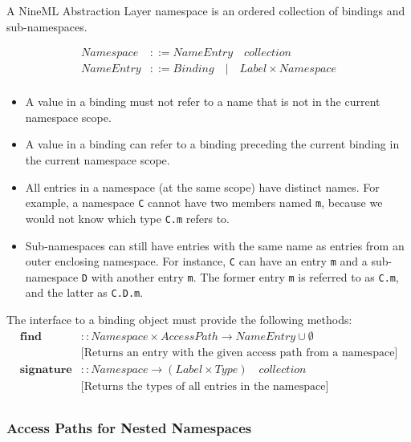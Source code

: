 \documentclass[a4paper]{article}
\begin{document}
A NineML Abstraction Layer namespace is an ordered collection of
bindings and sub-namespaces. 

\begin{equation*}
\begin{array}{ll}
   Namespace & ::= NameEntry \quad collection \\
   NameEntry & ::= Binding \quad  \lvert \quad Label \times Namespace \\
\end{array}
\end{equation*}

\begin{itemize}
\item A value in a binding must not refer to a name that is not in the
  current namespace scope.
\item A value in a binding can refer to a binding preceding the current binding in the
  current namespace scope.
\item All entries in a namespace (at the same scope) have distinct
  names. For example, a namespace \verb^C^ cannot have two members
  named \verb^m^, because we would not know which type \verb^C.m^
  refers to.
\item Sub-namespaces can still have entries with the same name as
  entries from an outer enclosing namespace. For instance, \verb^C^
  can have an entry \verb^m^ and a sub-namespace \verb^D^ with another
  entry \verb^m^.  The former entry \verb^m^ is referred to as
  \verb^C.m^, and the latter as \verb^C.D.m^.
\end{itemize}

The interface to a binding object must provide the following methods:
\begin{equation*}
\begin{array}{ll}
   \mathbf{find}  & :: Namespace \times AccessPath \rightarrow
   NameEntry \cup \emptyset \\
   & \textrm{[Returns an entry with the given access path from a namespace]} \\
   \mathbf{signature}  & :: Namespace \rightarrow (Label \times Type) \quad collection \\
   & \textrm{[Returns the types of all entries in the namespace]} \\
\end{array}
\end{equation*}

\subsubsection{Access Paths for Nested Namespaces}
\end{document}
